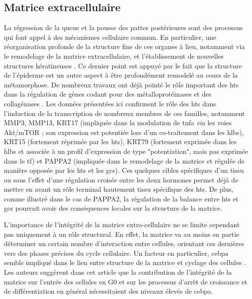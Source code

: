 \documentclass[../main.tex]{subfiles}
\begin{document}
	\subsection{Matrice extracellulaire}
		La régression de la queue et la pousse des pattes postérieures sont des processus qui font appel à des mécanismes cellulaire commun.
		En particulier, une réorganisation profonde de la structure fine de ces organes à lieu, notamment via le remodelage de la matrice extracellulaire, et l'établissement de nouvelles structures kératineuses \citep{Schreiber2003}.
		Ce dernier point est appuyé par le fait que la structure de l'épiderme est un autre aspect à être profondément remodelé au cours de la métamorphose.
		De nombreux travaux ont déjà pointé le rôle important des \glspl{ht} dans la régulation de gènes codant pour des métalloprotéinases et des collagénases \citep{Jung2004,Fu2007}.
		Les données présentées ici confirment le rôle des \glspl{ht} dans l'induction de la transcription de nombreux membres de ces familles, notamment MMP3, MMP13, KRT17 (impliquée dans la modulation de \gls{tnfa} \textit{via} les voies Akt/mTOR ; son expression est potentiée lors d'un co-traitement dans les \glspl{hlb}), KRT15 (fortement réprimée par les \glspl{ht}), KRT79 (fortement exprimée dans les \glspl{hlb} et associée à un profil d'expression de type "potentiation", mais pas exprimée dans le \gls{tf}) et PAPPA2 (impliquée dans le remodelage de la matrice et régulée de manière opposée par les \glspl{ht} et les \glspl{gc}).
		Ces quelques cibles spécifiques d'un tissu ou sous l'effet d'une régulation croisée entre les deux hormones permet déjà de mettre en avant un rôle terminal hautement tissu spécifique des \glspl{ht}.
		De plus, comme illustré dans le cas de PAPPA2, la régulation de la balance entre \glspl{ht} et \glspl{gc} pourrait avoir des conséquences locales sur la structure de la matrice.
		\par
		L'importance de l'intégrité de la matrice extra-cellulaire ne se limite cependant pas uniquement à un rôle structural.
		En effet, la matrice va au moins en partie déterminer un certain nombre d'interaction entre cellules, orientant ces dernières vers des phases précises du cycle cellulaire.
		Un facteur en particulier, \gls{cebpa} semble impliqué dans le lien entre structure de la matrice et cyclage des cellules \citep{Rana1994}.
		Les auteurs suggèrent dans cet article que la contribution de l'intégrité de la matrice sur l'entrée des cellules en G0 et sur les processus d’arrêt de croissance et de différentiation en général nécessitaient des niveaux élevés de \gls{cebpa}.
\end{document}
